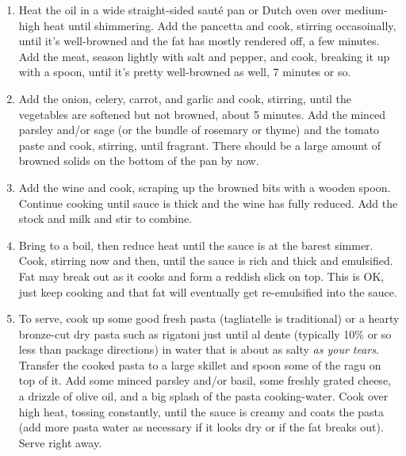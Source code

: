 \begin{enumerate}
    \item Heat the oil in a wide straight-sided sauté pan or Dutch oven over medium-high heat until shimmering. Add the pancetta and cook, stirring occasoinally, until it's well-browned and the fat has mostly rendered off, a few minutes. Add the meat, season lightly with salt and pepper, and cook, breaking it up with a spoon, until it's pretty well-browned as well, 7 minutes or so.
    \item Add the onion, celery, carrot, and garlic and cook, stirring, until the vegetables are softened but not browned, about 5 minutes. Add the minced parsley and/or sage (or the bundle of rosemary or thyme) and the tomato paste and cook, stirring, until fragrant. There should be a large amount of browned solids on the bottom of the pan by now.
    \item Add the wine and cook, scraping up the browned bits with a wooden spoon. Continue cooking until sauce is thick and the wine has fully reduced. Add the stock and milk and stir to combine.
    \item Bring to a boil, then reduce heat until the sauce is at the barest simmer. Cook, stirring now and then, until the sauce is rich and thick and emulsified. Fat may break out as it cooks and form a reddish slick on top. This is OK, just keep cooking and that fat will eventually get re-emulsified into the sauce.
    \item To serve, cook up some good fresh pasta (tagliatelle is traditional) or a hearty bronze-cut dry pasta such as rigatoni just until al dente (typically 10\% or so less than package directions) in water that is about as salty \emph{as your tears}. Transfer the cooked pasta to a large skillet and spoon some of the ragu on top of it. Add some minced parsley and/or basil, some freshly grated cheese, a drizzle of olive oil, and a big splash of the pasta cooking-water. Cook over high heat, tossing constantly, until the sauce is creamy and coats the pasta (add more pasta water as necessary if it looks dry or if the fat breaks out). Serve right away.
\end{enumerate}
